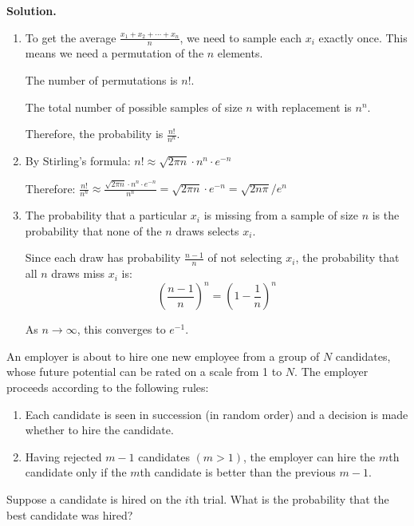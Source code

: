 \noindent\textbf{Solution.}
\begin{enumerate}[label=(\alph*)]
    \item To get the average $\frac{x_1 + x_2 + \cdots + x_n}{n}$, we need to sample each $x_i$ exactly once. This means we need a permutation of the $n$ elements.
    
    The number of permutations is $n!$.
    
    The total number of possible samples of size $n$ with replacement is $n^n$.
    
    Therefore, the probability is $\frac{n!}{n^n}$.
    
    \item By Stirling's formula: $n! \approx \sqrt{2\pi n} \cdot n^n \cdot e^{-n}$
    
    Therefore: $\frac{n!}{n^n} \approx \frac{\sqrt{2\pi n} \cdot n^n \cdot e^{-n}}{n^n} = \sqrt{2\pi n} \cdot e^{-n} = \sqrt{2n\pi}/e^n$
    
    \item The probability that a particular $x_i$ is missing from a sample of size $n$ is the probability that none of the $n$ draws selects $x_i$.
    
    Since each draw has probability $\frac{n-1}{n}$ of not selecting $x_i$, the probability that all $n$ draws miss $x_i$ is:
    \[ \left(\frac{n-1}{n}\right)^n = \left(1 - \frac{1}{n}\right)^n \]
    
    As $n \to \infty$, this converges to $e^{-1}$.
\end{enumerate}


\begin{problembox}
An employer is about to hire one new employee from a group of $N$ candidates, whose future potential can be rated on a scale from 1 to $N$. The employer proceeds according to the following rules:
\begin{enumerate}[label=(\roman*)]
    \item Each candidate is seen in succession (in random order) and a decision is made whether to hire the candidate.
    \item Having rejected $m-1$ candidates $(m>1)$, the employer can hire the $m$th candidate only if the $m$th candidate is better than the previous $m-1$.
\end{enumerate}
Suppose a candidate is hired on the $i$th trial. What is the probability that the best candidate was hired?
\end{problembox}

